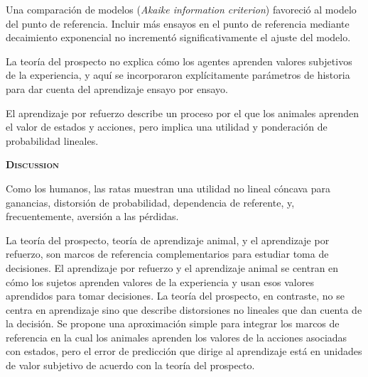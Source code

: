 \documentclass[a4paper,12pt]{article}
\begin{document}
Una comparación de modelos ({\slshape Akaike information criterion}) favoreció al modelo del punto de referencia.
Incluir más ensayos en el punto de referencia mediante decaimiento exponencial no incrementó significativamente el ajuste del modelo.

La teoría del prospecto no explica cómo los agentes aprenden valores subjetivos de la experiencia, y aquí se incorporaron explícitamente parámetros de historia para dar cuenta del aprendizaje ensayo por ensayo.

El aprendizaje por refuerzo describe un proceso por el que los animales aprenden el valor de estados y acciones, pero implica una utilidad y ponderación de probabilidad lineales.

{\noindent\scshape\bfseries Discussion}

Como los humanos, las ratas muestran una utilidad no lineal cóncava para ganancias, distorsión de probabilidad, dependencia de referente, y, frecuentemente, aversión a las pérdidas.

La teoría del prospecto, teoría de aprendizaje animal, y el aprendizaje por refuerzo, son marcos de referencia complementarios para estudiar toma de decisiones.
El aprendizaje por refuerzo y el aprendizaje animal se centran en cómo los sujetos aprenden valores de la experiencia y usan esos valores aprendidos para tomar decisiones.
La teoría del prospecto, en contraste, no se centra en aprendizaje sino que describe distorsiones no lineales que dan cuenta de la decisión.
Se propone una aproximación simple para integrar los marcos de referencia en la cual los animales aprenden los valores de la acciones asociadas con estados, pero el error de predicción que dirige al aprendizaje está en unidades de valor subjetivo de acuerdo con la teoría del prospecto.
\end{document}
